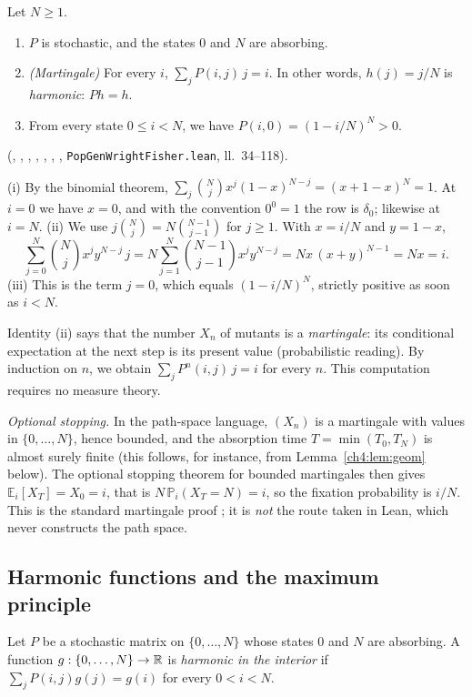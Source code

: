 \begin{proposition}\label{ch4:prop:wfbase}
Let $N\ge1$.
\begin{enumerate}[label=(\roman*),itemsep=1pt]
\item $P$ is stochastic, and the states $0$ and $N$ are absorbing.
\item \emph{(Martingale)} For every $i$, $\sum_jP(i,j)\,j=i$. In other words, $h(j)=j/N$ is \emph{harmonic}:
$Ph=h$.
\item From every state $0\le i<N$, we have $P(i,0)=(1-i/N)^N>0$.
\end{enumerate}
\tierA{} (, , , , ,
, , \texttt{PopGenWrightFisher.lean}, ll.~34--118).
\end{proposition}

\begin{humanproof}
(i) By the binomial theorem, $\sum_j\binom Nj x^j(1-x)^{N-j}=(x+1-x)^N=1$. At $i=0$ we have $x=0$, and with the
convention $0^0=1$ the row is $\delta_0$; likewise at $i=N$.
(ii) We use $j\binom Nj=N\binom{N-1}{j-1}$ for $j\ge1$. With $x=i/N$ and $y=1-x$,
\[
\sum_{j=0}^N\binom Nj x^jy^{N-j}\,j=N\sum_{j=1}^{N}\binom{N-1}{j-1}x^jy^{N-j}=Nx\,(x+y)^{N-1}=Nx=i .
\]
(iii) This is the term $j=0$, which equals $(1-i/N)^N$, strictly positive as soon as $i<N$.
\end{humanproof}

Identity (ii) says that the number $X_n$ of mutants is a \emph{martingale}: its conditional expectation at the
next step is its present value \tierC{} (probabilistic reading). By induction on $n$, we obtain
$\sum_jP^n(i,j)\,j=i$ for every $n$. This computation requires no measure theory.

\begin{uniremark}\tierL{} \emph{Optional stopping.} In the path-space language, $(X_n)$ is a martingale with
values in $\{0,\dots,N\}$, hence bounded, and the absorption time $T=\min(T_0,T_N)$ is almost surely finite (this
follows, for instance, from Lemma~\ref{ch4:lem:geom} below). The optional stopping theorem for bounded martingales
then gives $\mathbb E_i[X_T]=X_0=i$, that is $N\,\mathbb P_i(X_T=N)=i$, so the fixation probability is $i/N$.
This is the standard martingale proof \cite{app:williams,app:norris}; it is \emph{not} the route taken in Lean,
which never constructs the path space.
\end{uniremark}

\subsection{Harmonic functions and the maximum principle}
\begin{definition}
Let $P$ be a stochastic matrix on $\{0,\dots,N\}$ whose states $0$ and $N$ are absorbing. A function
$g:\{0,\dots,N\}\to\mathbb{R}$ is \emph{harmonic in the interior} if $\sum_jP(i,j)g(j)=g(i)$ for every $0<i<N$.
\end{definition}

